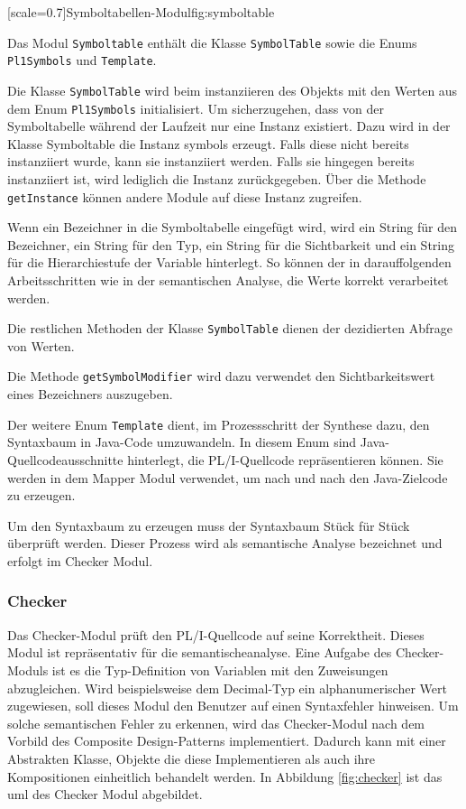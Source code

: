 [scale=0.7]{Symboltabellen-Modul}{fig:symboltable}
\pagebreak

Das Modul \verb+Symboltable+ enthält die Klasse \verb+SymbolTable+
sowie die Enums \verb+Pl1Symbols+ und \verb+Template+.

Die Klasse \verb+SymbolTable+ wird beim instanziieren des Objekts mit den Werten aus dem Enum \verb+Pl1Symbols+ initialisiert. Um sicherzugehen, dass von der Symboltabelle während der Laufzeit nur eine Instanz existiert. 
Dazu wird in der Klasse Symboltable die Instanz symbols erzeugt. Falls diese nicht bereits instanziiert wurde, kann sie instanziiert werden. Falls sie hingegen bereits instanziiert ist, wird lediglich die Instanz zurückgegeben.
Über die Methode \verb+getInstance+ können andere Module auf diese Instanz zugreifen.

Wenn ein Bezeichner in die Symboltabelle eingefügt wird, wird ein String für den Bezeichner, ein String für den Typ, ein String für die Sichtbarkeit und ein String für die Hierarchiestufe der Variable hinterlegt. So können der in darauffolgenden Arbeitsschritten wie in der semantischen Analyse, die Werte korrekt verarbeitet werden.

Die restlichen Methoden der Klasse \verb+SymbolTable+ dienen der dezidierten Abfrage von Werten.

Die Methode \verb+getSymbolModifier+ wird dazu verwendet den Sichtbarkeitswert eines Bezeichners auszugeben.

Der weitere Enum \verb+Template+ dient, im Prozessschritt der Synthese dazu, den Syntaxbaum in Java-Code umzuwandeln.
In diesem Enum sind Java-Quellcodeausschnitte hinterlegt, die PL/I-Quellcode repräsentieren können. Sie werden in dem Mapper Modul verwendet,
um nach und nach den Java-Zielcode zu erzeugen.

Um den Syntaxbaum zu erzeugen muss der Syntaxbaum Stück für Stück überprüft werden. Dieser Prozess wird als semantische Analyse bezeichnet und erfolgt im Checker Modul.
 
 \pagebreak
\subsubsection{Checker}
Das Checker-Modul prüft den PL/I-Quellcode auf seine Korrektheit. 
Dieses Modul ist repräsentativ für die semantischeanalyse. 
Eine Aufgabe des Checker-Moduls ist es die Typ-Definition von Variablen mit den Zuweisungen abzugleichen.
Wird beispielsweise dem Decimal-Typ ein alphanumerischer Wert zugewiesen, soll dieses Modul den Benutzer auf einen Syntaxfehler hinweisen. Um solche semantischen Fehler zu erkennen, wird das Checker-Modul nach dem Vorbild des Composite Design-Patterns implementiert. Dadurch kann mit einer Abstrakten Klasse, Objekte die diese Implementieren als auch ihre Kompositionen einheitlich behandelt werden.
In Abbildung \ref{fig:checker} ist das \ac{uml} des Checker Modul abgebildet.

